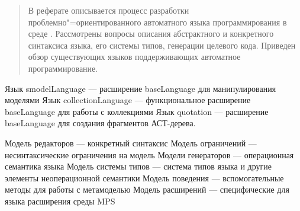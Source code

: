 \documentclass[a4paper,12pt]{article}
\begin{document}

\begin{abstract}
В реферате описывается процесс разработки проблемно"=ориентированного автоматного языка программирования в среде \MPS{}. Рассмотрены вопросы описания абстрактного и конкретного синтаксиса языка, его системы типов, генерации целевого кода. Приведен обзор существующих языков поддерживающих автоматное программирование.
\end{abstract}

\tableofcontents







\TBD Язык smodelLanguage — расширение baseLanguage для манипулирования моделями
\TBD Язык collectionLanguage — функциональное расширение baseLanguage для работы с коллекциями
\TBD Язык quotation — расширение baseLanguage для создания фрагментов АСТ-дерева.





\TBD Модель редакторов — конкретный синтаксис
\TBD Модель ограничений — несинтаксические ограничения на модель
\TBD Модели генераторов — операционная семантика языка
\TBD Модель системы типов — система типов языка и другие элементы неоперационной семантики
\TBD Модель поведения — вспомогательные методы для работы с метамоделью
\TBD Модель расширений — специфические для языка расширения среды MPS
\end{document}
